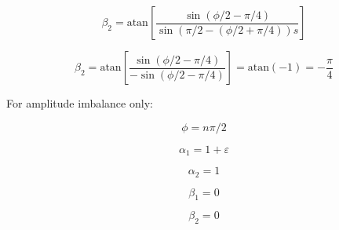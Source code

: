 \documentclass{article}
\begin{document}
\begin{equation}
	\beta_2 = \text{atan}\left[\frac{\sin(\phi/2-\pi/4)}{\sin(\pi/2-(\phi/2+\pi/4))s}\right]
\end{equation}

\begin{equation}
	\beta_2 = \text{atan}\left[\frac{\sin(\phi/2-\pi/4)}{-\sin(\phi/2-\pi/4)}\right] = \text{atan}(-1) = -\frac{\pi}{4}
\end{equation}

For amplitude imbalance only:

\begin{equation}
	\phi = n\pi/2
\end{equation}

\begin{equation}
	\alpha_1 = 1 + \varepsilon
\end{equation}

\begin{equation}
	\alpha_2 = 1
\end{equation}

\begin{equation}
	\beta_1 = 0
\end{equation}

\begin{equation}
	\beta_2 = 0
\end{equation}
\end{document}
